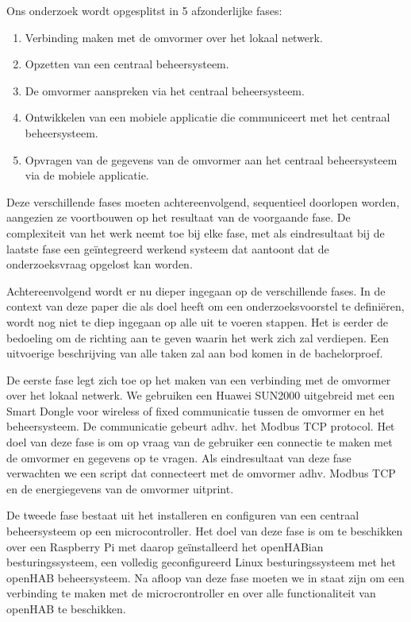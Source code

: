 \documentclass{hogent-article}
\begin{document}
    Ons onderzoek wordt opgesplitst in 5 afzonderlijke fases:
    \begin{enumerate}
        \item Verbinding maken met de omvormer over het lokaal netwerk.
        \item Opzetten van een centraal beheersysteem.
        \item De omvormer aanspreken via het centraal beheersysteem.
        \item Ontwikkelen van een mobiele applicatie die communiceert met het centraal beheersysteem.
        \item Opvragen van de gegevens van de omvormer aan het centraal beheersysteem via de mobiele applicatie.
    \end{enumerate}
    Deze verschillende fases moeten achtereenvolgend, sequentieel doorlopen worden, aangezien ze voortbouwen op het resultaat van de voorgaande fase. De complexiteit van het werk neemt toe bij elke fase, met als eindresultaat bij de laatste fase een geïntegreerd werkend systeem dat aantoont dat de onderzoeksvraag opgelost kan worden.
    
    Achtereenvolgend wordt er nu dieper ingegaan op de verschillende fases. In de context van deze paper die als doel heeft om een onderzoeksvoorstel te definiëren, wordt nog niet te diep ingegaan op alle uit te voeren stappen. Het is eerder de bedoeling om de richting aan te geven waarin het werk zich zal verdiepen. Een uitvoerige beschrijving van alle taken zal aan bod komen in de bachelorproef.
    
    De eerste fase legt zich toe op het maken van een verbinding met de omvormer over het lokaal netwerk. We gebruiken een Huawei SUN2000 uitgebreid met een Smart Dongle voor wireless of fixed communicatie tussen de omvormer en het beheersysteem. De communicatie gebeurt adhv. het Modbus TCP protocol. Het doel van deze fase is om op vraag van de gebruiker een connectie te maken met de omvormer en gegevens op te vragen. Als eindresultaat van deze fase verwachten we een script dat connecteert met de omvormer adhv. Modbus TCP en de energiegevens van de omvormer uitprint.
    
    De tweede fase bestaat uit het installeren en configuren van een centraal beheersysteem op een microcontroller. Het doel van deze fase is om te beschikken over een Raspberry Pi met daarop geïnstalleerd het openHABian besturingssysteem, een volledig geconfigureerd Linux besturingssysteem met het openHAB beheersysteem. Na afloop van deze fase moeten we in staat zijn om een verbinding te maken met de microcrontroller en over alle functionaliteit van openHAB te beschikken.
    
\end{document}
